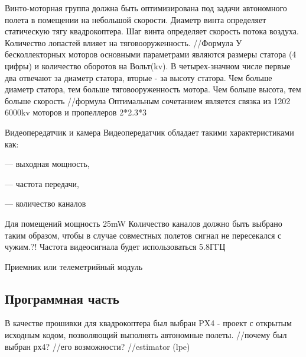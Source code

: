 Винто-моторная группа должна быть оптимизирована под задачи автономного полета в помещении на небольшой скорости.
Диаметр винта определяет статическую тягу квадрокоптера.
Шаг винта определяет скорость потока воздуха.
Количество лопастей влияет на тяговооруженность.
//Формула 
У бесколлекторных моторов основными параметрами являются размеры статора (4 цифры) и количество оборотов на Вольт(kv). В четырех-значном числе первые два отвечают за диаметр статора, вторые - за высоту статора. Чем больше диаметр статора, тем больше тяговооруженность мотора. Чем больше высота, тем больше скорость
//формула
Оптимальным сочетанием является связка из 1202 6000kv моторов и пропеллеров 2*2.3*3

Видеопередатчик и камера
Видеопередатчик обладает такими характеристиками как:

--- выходная мощность,

--- частота передачи,

--- количество каналов

Для помещений мощность 25mW
Количество каналов должно быть выбрано таким образом, чтобы в случае совместных полетов сигнал не пересекался с чужим.?!
Частота видеосигнала будет использоваться 5.8ГГЦ

Приемник или телеметрийный модуль


\subsection{Программная часть}
В качестве прошивки для квадрокоптера был выбран PX4 - проект с открытым исходным кодом, позволяющий выполнять автономные полеты.
//почему был выбран рх4?
//его возможности?
//estimator (lpe)
